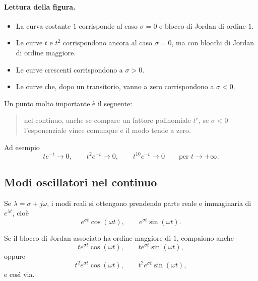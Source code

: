 \paragraph{Lettura della figura.}
\begin{itemize}
    \item La curva costante $1$ corrisponde al caso $\sigma=0$ e blocco di Jordan di ordine $1$.
    \item Le curve $t$ e $t^2$ corrispondono ancora al caso $\sigma=0$, ma con blocchi di Jordan di ordine maggiore.
    \item Le curve crescenti corrispondono a $\sigma>0$.
    \item Le curve che, dopo un transitorio, vanno a zero corrispondono a $\sigma<0$.
\end{itemize}

Un punto molto importante è il seguente:

\begin{quote}
nel continuo, anche se compare un fattore polinomiale $t^r$, se $\sigma<0$ l'esponenziale vince comunque e il modo tende a zero.
\end{quote}

Ad esempio
\[
t e^{-t}\to 0,
\qquad
t^2 e^{-t}\to 0,
\qquad
t^{10}e^{-t}\to 0
\qquad \text{per } t\to +\infty.
\]

\subsection{Modi oscillatori nel continuo}

Se $\lambda=\sigma+j\omega$, i modi reali si ottengono prendendo parte reale e immaginaria di $e^{\lambda t}$, cioè
\[
e^{\sigma t}\cos(\omega t),
\qquad
e^{\sigma t}\sin(\omega t).
\]

Se il blocco di Jordan associato ha ordine maggiore di $1$, compaiono anche
\[
t e^{\sigma t}\cos(\omega t),\qquad
t e^{\sigma t}\sin(\omega t),
\]
oppure
\[
t^2 e^{\sigma t}\cos(\omega t),\qquad
t^2 e^{\sigma t}\sin(\omega t),
\]
e così via.

